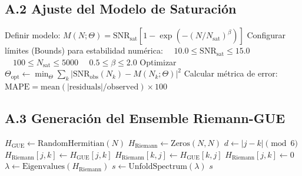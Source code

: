 \documentclass[12pt, a4paper]{article}
\theoremstyle{plain}
\theoremstyle{definition}
\begin{document}
\subsection{A.2 Ajuste del Modelo de Saturación}

\begin{algorithm}[H]
\caption{Ajuste Robusto de la Dinámica del SNR}
\label{alg:ajuste_snr}
\begin{algorithmic}[1]
\State Definir modelo: $M(N; \Theta) = \text{SNR}_{\text{sat}} [1 - \exp(-(N/N_{\text{sat}})^\beta)]$
\State Configurar límites (Bounds) para estabilidad numérica:
    \State $\quad 10.0 \leq \text{SNR}_{\text{sat}} \leq 15.0$
    \State $\quad 100 \leq N_{\text{sat}} \leq 5000$
    \State $\quad 0.5 \leq \beta \leq 2.0$
\State Optimizar $\Theta_{\text{opt}} \gets \min_{\Theta} \sum_k | \text{SNR}_{\text{obs}}(N_k) - M(N_k; \Theta) |^2$
\State Calcular métrica de error: $\text{MAPE} = \text{mean}(|\text{residuals}| / \text{observed}) \times 100$
\end{algorithmic}
\end{algorithm}

\subsection{A.3 Generación del Ensemble Riemann-GUE}

\begin{algorithm}[H]
\caption{Simulación Monte Carlo del Ensemble Riemann-GUE}
\label{alg:monte_carlo_riemann}
\begin{algorithmic}[1]
    \State $H_{\text{GUE}} \gets \text{RandomHermitian}(N)$ 
    \State $H_{\text{Riemann}} \gets \text{Zeros}(N, N)$
            \State $d \gets |j - k| \pmod 6$
             
                \State $H_{\text{Riemann}}[j, k] \gets H_{\text{GUE}}[j, k]$
                \State $H_{\text{Riemann}}[k, j] \gets H_{\text{GUE}}[k, j]$
            \Else
                \State $H_{\text{Riemann}}[j, k] \gets 0$ 
            \EndIf
        \EndFor
    \EndFor
    \State $\lambda \gets \text{Eigenvalues}(H_{\text{Riemann}})$
    \State $s \gets \text{UnfoldSpectrum}(\lambda)$ 
    \State \Return $s$
\EndFunction
\end{algorithmic}
\end{algorithm}
\end{document}

